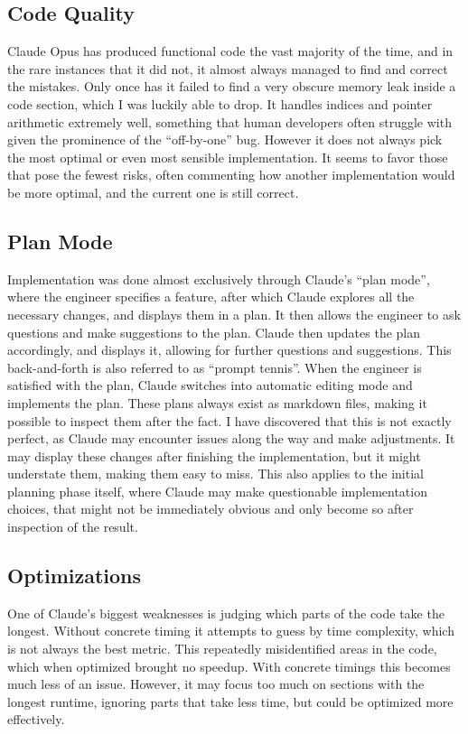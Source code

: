 \subsection{Code Quality}

Claude Opus has produced functional code the vast majority of the time, and in the rare instances that it did not, it almost always managed to find and correct the mistakes.
Only once has it failed to find a very obscure memory leak inside a code section, which I was luckily able to drop.
It handles indices and pointer arithmetic extremely well, something that human developers often struggle with given the prominence of the ``off-by-one'' bug.
However it does not always pick the most optimal or even most sensible implementation.
It seems to favor those that pose the fewest risks, often commenting how another implementation would be more optimal, and the current one is still correct.

\subsection{Plan Mode}

Implementation was done almost exclusively through Claude's ``plan mode'', where the engineer specifies a feature, after which Claude explores all the necessary changes, and displays them in a plan.
It then allows the engineer to ask questions and make suggestions to the plan.
Claude then updates the plan accordingly, and displays it, allowing for further questions and suggestions.
This back-and-forth is also referred to as ``prompt tennis''.
When the engineer is satisfied with the plan, Claude switches into automatic editing mode and implements the plan.
These plans always exist as markdown files, making it possible to inspect them after the fact.
I have discovered that this is not exactly perfect, as Claude may encounter issues along the way and make adjustments.
It may display these changes after finishing the implementation, but it might understate them, making them easy to miss.
This also applies to the initial planning phase itself, where Claude may make questionable implementation choices, that might not be immediately obvious and only become so after inspection of the result.

\subsection{Optimizations}

One of Claude's biggest weaknesses is judging which parts of the code take the longest.
Without concrete timing it attempts to guess by time complexity, which is not always the best metric.
This repeatedly misidentified areas in the code, which when optimized brought no speedup.
With concrete timings this becomes much less of an issue.
However, it may focus too much on sections with the longest runtime, ignoring parts that take less time, but could be optimized more effectively.

